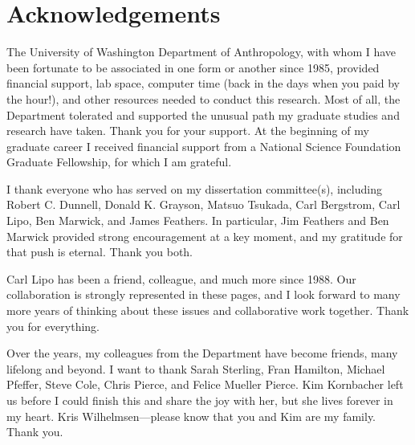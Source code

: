 





\renewcommand{\cftchapterfont}{\normalsize\normalfont}   
\renewcommand{\cftpartfont}{\normalsize\normalfont}   
\renewcommand{\cftsectionfont}{\normalsize\normalfont} 
\renewcommand{\cftsubsectionfont}{\normalsize\normalfont} 
\renewcommand*{\cftpartname}{Part\space}
\newpage
\setcounter{tocdepth}{3} 
\tableofcontents*
\cleardoublepage
\listoffigures
\cleardoublepage
\listoftables
\cleardoublepage



\clearpage
\chapter{Acknowledgements}

The University of Washington Department of Anthropology, with whom I have been fortunate to be associated in one form or another since 1985, provided financial support, lab space, computer time (back in the days when you paid by the hour!), and other resources needed to conduct this research.  Most of all, the Department tolerated and supported the unusual path my graduate studies and research have taken.  Thank you for your support.  At the beginning of my graduate career I received financial support from a National Science Foundation Graduate Fellowship, for which I am grateful.

\vskip 0.5cm

I thank everyone who has served on my dissertation committee(s), including Robert C. Dunnell, Donald K. Grayson, Matsuo Tsukada, Carl Bergstrom, Carl Lipo, Ben Marwick, and James Feathers.  In particular, Jim Feathers and Ben Marwick provided strong encouragement at a key moment, and my gratitude for that push is eternal.  Thank you both. 

\vskip 0.5cm

Carl Lipo has been a friend, colleague, and much more since 1988.  Our collaboration is strongly represented in these pages, and I look forward to many more years of thinking about these issues and collaborative work together.  Thank you for everything.

\vskip 0.5cm

Over the years, my colleagues from the Department have become friends, many lifelong and beyond.  I want to thank Sarah Sterling, Fran Hamilton, Michael Pfeffer, Steve Cole,  Chris Pierce, and Felice Mueller Pierce.  Kim Kornbacher left us before I could finish this and share the joy with her, but she lives forever in my heart.  Kris Wilhelmsen---please know that you and Kim are my family.  Thank you.

